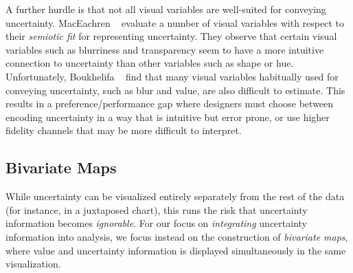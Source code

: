 A further hurdle is that not all visual variables are well-suited for conveying uncertainty. MacEachren \ea~\cite{maceachren2012visual} evaluate a number of visual variables with respect to their \emph{semiotic fit} for representing uncertainty. They observe that certain visual variables such as blurriness and transparency seem to have a more intuitive connection to uncertainty than other variables such as shape or hue. Unfortunately, Boukhelifa \ea~\cite{boukhelifa2012evaluating} find that many visual variables habitually used for conveying uncertainty, such as blur and value, are also difficult to estimate. This results in a preference/performance gap where designers must choose between encoding uncertainty in a way that is intuitive but error prone, or use higher fidelity channels that may be more difficult to interpret.





\subsection{Bivariate Maps}

While uncertainty can be visualized entirely separately from the rest of the data (for instance, in a juxtaposed chart), this runs the risk that uncertainty information becomes \emph{ignorable}\cite{moritz2017trust}. For our focus on \emph{integrating} uncertainty information into analysis, we focus instead on the construction of \emph{bivariate maps}, where value and uncertainty information is displayed simultaneously in the same visualization.


